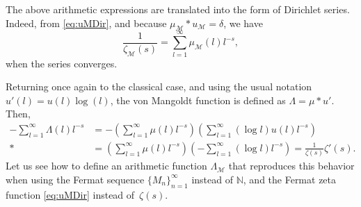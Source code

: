 \documentclass[11pt, a4paper]{article}
\newcommand{\N}{\mathbb{N}}
\newcommand{\calM}{\mathcal{M}}
\newcommand{\manM}{\Lambda_{\calM}}
\newcommand{\uM}{u_\calM}
\newcommand{\muM}{\mu_\calM}
\newcommand{\Mp}{\calM_{\mathcal{P}}}
\theoremstyle{plain}
\theoremstyle{definition}
\begin{document}

The above arithmetic expressions are translated into the form of Dirichlet series.
Indeed, from \eqref{eq:uMDir}, and because $\muM * \uM = \delta$, we have
\begin{equation}
\label{eq:MuMp}
  \frac{1}{\zeta_{\calM}(s)} = \sum_{l=1}^{\infty} \muM(l) l^{-s},
\end{equation}
when the series converges.

Returning once again to the classical case, and using the usual notation $u'(l) = u(l) \log(l)$, the von Mangoldt function is defined as $\Lambda = \mu * u'$. Then,
\begin{align*}
  -\sum_{l=1}^{\infty} \Lambda(l)l^{-s} 
  &= - \left( \sum_{l=1}^\infty \mu(l) l^{-s} \right)
  \left( \sum_{l=1}^\infty (\log l) u(l) l^{-s} \right) \\*
  &= \left( \sum_{l=1}^\infty \mu(l) l^{-s} \right)
  \left( {-}\sum_{l=1}^\infty (\log l) l^{-s} \right) 
  = \frac{1}{\zeta(s)} \zeta'(s).
\end{align*}
Let us see how to define an arithmetic function $\manM$ that reproduces this behavior when using the Fermat sequence $\{M_n\}_{n=1}^\infty$ instead of $\N$, and the Fermat zeta function \eqref{eq:uMDir} instead of~$\zeta(s)$.
\end{document}
